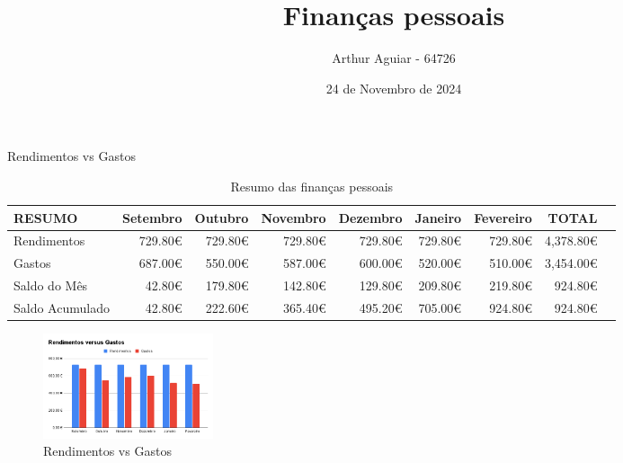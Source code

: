 \documentclass[11pt]{beamer}
\title{Finanças pessoais}
\author{Arthur Aguiar - 64726}
\date{24 de Novembro de 2024}
\begin{document}
	\maketitle

	\begin{frame}{Rendimentos vs Gastos}
		\begin{table}[!h]\centering
			\tiny
			\begin{tabular}{lrrrrrrrr}\toprule
				RESUMO &Setembro &Outubro &Novembro &Dezembro &Janeiro &Fevereiro &TOTAL \\\midrule
				\cellcolor[HTML]{4285f4}Rendimentos &729.80€ &729.80€ &729.80€ &729.80€ &729.80€ &729.80€ &\cellcolor[HTML]{4285f4}4,378.80€ \\
				\cellcolor[HTML]{4285f4}Gastos &687.00€ &550.00€ &587.00€ &600.00€ &520.00€ &510.00€ &\cellcolor[HTML]{4285f4}3,454.00€ \\
				\cellcolor[HTML]{4285f4}Saldo do Mês &42.80€ &179.80€ &142.80€ &129.80€ &209.80€ &219.80€ &\cellcolor[HTML]{4285f4}924.80€ \\
				\cellcolor[HTML]{4285f4}Saldo Acumulado &42.80€ &222.60€ &365.40€ &495.20€ &705.00€ &924.80€ &\cellcolor[HTML]{4285f4}924.80€ \\
				\bottomrule
			\end{tabular}
			\caption{Resumo das finanças pessoais}\label{tab:resumo }
		\end{table}

		\begin{figure}
			\includegraphics[width=5cm]{./rendimentos_gastos_grafico_barra.png}
			\caption{Rendimentos vs Gastos}\label{fig:barra}
		\end{figure}
	\end{frame}
\end{document}

